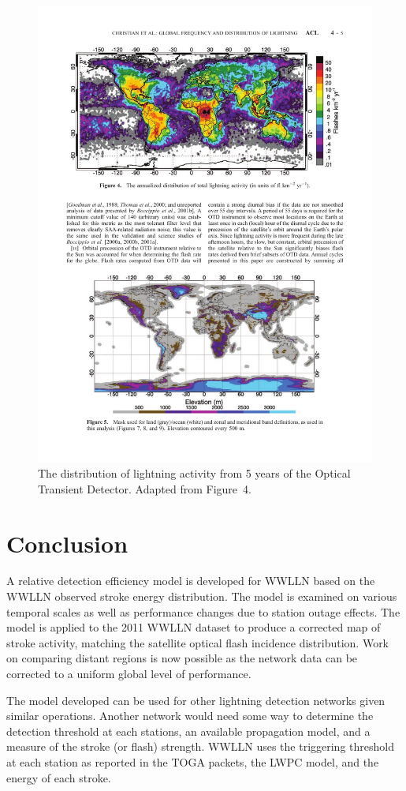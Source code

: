 \begin{figure}[ht!]
   \centering
\noindent\includegraphics[scale=0.75]{efficiency/Figures/christian2003_map.pdf}
   \caption{The  distribution of lightning activity from 5 years of the Optical Transient Detector.
   Adapted from \citet{Christian2003} Figure~4.}
   \label{efficiency:fig:Christian2003}
\end{figure}

\section{Conclusion}

A relative detection efficiency model is developed for WWLLN based on the WWLLN observed stroke energy distribution.
The model is examined on various temporal scales as well as performance changes due to station outage effects.
The model is applied to the 2011 WWLLN dataset to produce a corrected map of stroke activity, matching the satellite optical flash incidence distribution.
Work on comparing distant regions is now possible as the network data can be corrected to a uniform global level of performance.

The model developed can be used for other lightning detection networks given similar operations.
Another network would need some way to determine the detection threshold at each stations, an available propagation model, and a measure of the stroke (or flash) strength.
WWLLN uses the triggering threshold at each station as reported in the TOGA packets, the LWPC model, and the energy of each stroke.
